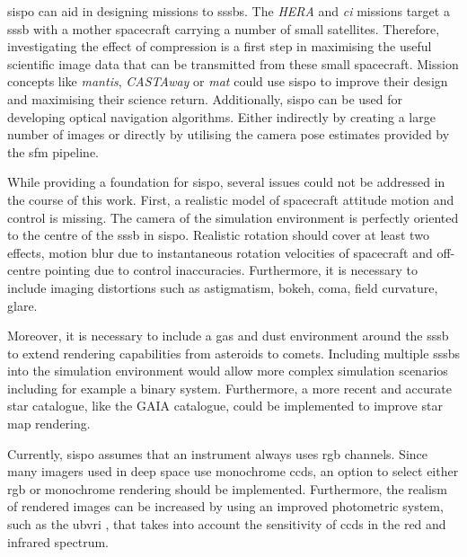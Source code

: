 \Gls{sispo} can aid in designing missions to \glspl{sssb}. The \textit{HERA} and \textit{\gls{ci}} missions target a \gls{sssb} with a mother spacecraft carrying a number of small satellites. Therefore, investigating the effect of compression is a first step in maximising the useful scientific image data that can be transmitted from these small spacecraft. Mission concepts like \textit{\gls{mantis}}, \textit{CASTAway} or \textit{\gls{mat}} could use \gls{sispo} to improve their design and maximising their science return. Additionally, \gls{sispo} can be used for developing optical navigation algorithms. Either indirectly by creating a large number of images or directly by utilising the camera pose estimates provided by the \gls{sfm} pipeline.

While providing a foundation for \gls{sispo}, several issues could not be addressed in the course of this work. First, a realistic model of spacecraft attitude motion and control is missing. The camera of the simulation environment is perfectly oriented to the centre of the \gls{sssb} in \gls{sispo}. Realistic rotation should cover at least two effects, motion blur due to instantaneous rotation velocities of spacecraft and off-centre pointing due to control inaccuracies. Furthermore, it is necessary to include imaging distortions such as astigmatism, bokeh, coma, field curvature, glare.

Moreover, it is necessary to include a gas and dust environment around the \gls{sssb} to extend rendering capabilities from asteroids to comets. Including multiple \glspl{sssb} into the simulation environment would allow more complex simulation scenarios including  for example a binary system. Furthermore, a more recent and accurate star catalogue, like the GAIA catalogue, could be implemented to improve star map rendering.

Currently, \gls{sispo} assumes that an instrument always uses \gls{rgb} channels. Since many imagers used in deep space use monochrome \glspl{ccd}, an option to select either \gls{rgb} or monochrome rendering should be implemented. Furthermore, the realism of rendered images can be increased by using an improved photometric system, such as the \gls{ubvri} \cite{Bessell1993PhotometricSystems}, that takes into account the sensitivity of \glspl{ccd} in the red and infrared spectrum.

